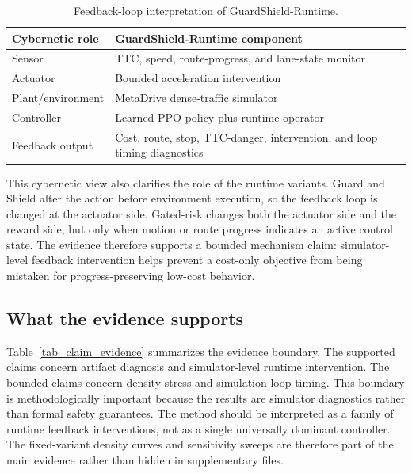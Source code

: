 \documentclass[pdflatex,sn-mathphys-ay]{sn-jnl}
\begin{document}
\begin{table}[!htbp]
\centering
\caption{Feedback-loop interpretation of GuardShield-Runtime.}
\label{tab_cybernetic_mapping}
\footnotesize
\setlength{\tabcolsep}{5.0pt}
\begin{tabular}{@{}p{}p{}@{}}
\toprule
Cybernetic role & GuardShield-Runtime component \\
\midrule
Sensor & TTC, speed, route-progress, and lane-state monitor \\
Actuator & Bounded acceleration intervention \\
Plant/environment & MetaDrive dense-traffic simulator \\
Controller & Learned PPO policy plus runtime operator \\
Feedback output & Cost, route, stop, TTC-danger, intervention, and loop timing diagnostics \\
\bottomrule
\end{tabular}
\end{table}

This cybernetic view also clarifies the role of the runtime variants. Guard and Shield alter the action before environment execution, so the feedback loop is changed at the actuator side. Gated-risk changes both the actuator side and the reward side, but only when motion or route progress indicates an active control state. The evidence therefore supports a bounded mechanism claim: simulator-level feedback intervention helps prevent a cost-only objective from being mistaken for progress-preserving low-cost behavior.

\subsection{What the evidence supports}\label{sec_discussion_evidence}
Table~\ref{tab_claim_evidence} summarizes the evidence boundary. The supported claims concern artifact diagnosis and simulator-level runtime intervention. The bounded claims concern density stress and simulation-loop timing. This boundary is methodologically important because the results are simulator diagnostics rather than formal safety guarantees. The method should be interpreted as a family of runtime feedback interventions, not as a single universally dominant controller. The fixed-variant density curves and sensitivity sweeps are therefore part of the main evidence rather than hidden in supplementary files.


\end{document}
